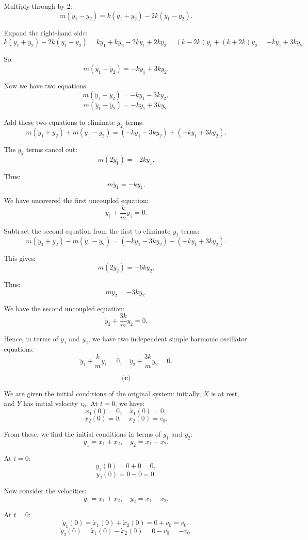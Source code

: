 \documentclass{article}
\begin{document}
Multiply through by 2:
\[
m(\ddot{y}_1 - \ddot{y}_2) = k(y_1 + y_2) - 2k(y_1 - y_2).
\]

Expand the right-hand side:
\[
k(y_1 + y_2) - 2k(y_1 - y_2) = k y_1 + k y_2 - 2k y_1 + 2k y_2 = (k - 2k) y_1 + (k + 2k) y_2 = -k y_1 + 3k y_2.
\]

So:
\[
m (\ddot{y}_1 - \ddot{y}_2) = -k y_1 + 3k y_2.
\]

Now we have two equations:
\[
m(\ddot{y}_1 + \ddot{y}_2) = -k y_1 - 3k y_2,
\]
\[
m(\ddot{y}_1 - \ddot{y}_2) = -k y_1 + 3k y_2.
\]

Add these two equations to eliminate \( y_2 \) terms:
\[
m(\ddot{y}_1 + \ddot{y}_2) + m(\ddot{y}_1 - \ddot{y}_2) = (-k y_1 - 3k y_2) + (-k y_1 + 3k y_2).
\]

The \( y_2 \) terms cancel out:
\[
m(2 \ddot{y}_1) = -2k y_1.
\]

Thus:
\[
m \ddot{y}_1 = -k y_1.
\]

We have uncovered the first uncoupled equation:
\[
\ddot{y}_1 + \frac{k}{m}y_1 = 0.
\]

Subtract the second equation from the first to eliminate \( y_1 \) terms:
\[
m(\ddot{y}_1 + \ddot{y}_2) - m(\ddot{y}_1 - \ddot{y}_2) = (-k y_1 - 3k y_2) - (-k y_1 + 3k y_2).
\]

This gives:
\[
m(2\ddot{y}_2) = -6k y_2.
\]

Thus:
\[
m \ddot{y}_2 = -3k y_2.
\]

We have the second uncoupled equation:
\[
\ddot{y}_2 + \frac{3k}{m} y_2 = 0.
\]

Hence, in terms of \( y_1 \) and \( y_2 \), we have two independent simple harmonic oscillator equations:
\[
\ddot{y}_1 + \frac{k}{m} y_1 = 0, \quad \ddot{y}_2 + \frac{3k}{m} y_2 = 0.
\]

\[
\textbf{(c)}
\]

We are given the initial conditions of the original system: initially, \( X \) is at rest, and \( Y \) has initial velocity \( v_0 \). At \( t=0 \), we have:
\[
x_1(0) = 0, \quad \dot{x}_1(0) = 0,
\]
\[
x_2(0) = 0, \quad \dot{x}_2(0) = v_0.
\]

From these, we find the initial conditions in terms of \( y_1 \) and \( y_2 \):
\[
y_1 = x_1 + x_2, \quad y_2 = x_1 - x_2.
\]

At \( t=0 \):
\[
y_1(0) = 0 + 0 = 0,
\]
\[
y_2(0) = 0 - 0 = 0.
\]

Now consider the velocities:
\[
\dot{y}_1 = \dot{x}_1 + \dot{x}_2, \quad \dot{y}_2 = \dot{x}_1 - \dot{x}_2.
\]

At \( t=0 \):
\[
\dot{y}_1(0) = \dot{x}_1(0) + \dot{x}_2(0) = 0 + v_0 = v_0,
\]
\[
\dot{y}_2(0) = \dot{x}_1(0) - \dot{x}_2(0) = 0 - v_0 = -v_0.
\]
\end{document}
